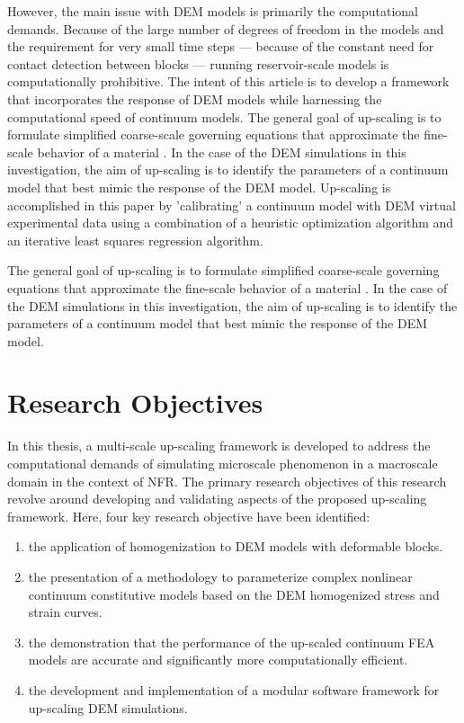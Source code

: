 However, the main issue with DEM models is primarily the computational demands. Because of the large number of degrees of freedom in the models and the requirement for very small time steps --- because of the constant need for contact detection between blocks --- running reservoir-scale models is computationally prohibitive. The intent of this article is to develop a framework that incorporates the response of DEM models while harnessing the computational speed of continuum models. The general goal of up-scaling is to formulate simplified coarse-scale governing equations that approximate the fine-scale behavior of a material \citep{Geers_2010}. In the case of the DEM simulations in this investigation, the aim of up-scaling is to identify the parameters of a continuum model that best mimic the response of the DEM model.  Up-scaling is accomplished in this paper by 'calibrating' a continuum model with DEM virtual experimental data using a combination of a heuristic optimization algorithm and an iterative least squares regression algorithm.

The general goal of up-scaling is to formulate simplified coarse-scale governing equations that approximate the fine-scale behavior of a material \citep{Geers_2010}. In the case of the DEM simulations in this investigation, the aim of up-scaling is to identify the parameters of a continuum model that best mimic the response of the DEM model.

\section{Research Objectives}

In this thesis, a multi-scale up-scaling framework is developed to address the computational demands of simulating microscale phenomenon in a macroscale domain in the context of NFR. The primary research objectives of this research revolve around developing and validating aspects of the proposed up-scaling framework. Here, four key research objective have been identified:

\begin{enumerate}
\item the application of homogenization to DEM models with deformable blocks.
\item the presentation of a methodology to parameterize complex nonlinear continuum constitutive models based on the DEM homogenized stress and strain curves.
\item the demonstration that the performance of the up-scaled continuum FEA models are accurate and significantly more computationally efficient.
\item the development and implementation of a modular software framework for up-scaling DEM simulations.
\end{enumerate}

